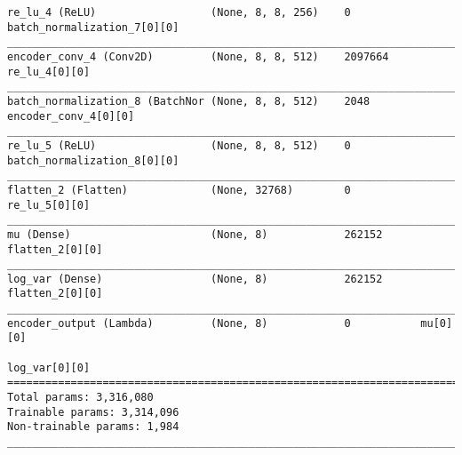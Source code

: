 \begin{lstlisting}[caption={CelebA-VAE-GAN Encoder},captionpos=b,basicstyle=\tiny, label={lst:mnist-vae-encoder}]
re_lu_4 (ReLU)                  (None, 8, 8, 256)    0           batch_normalization_7[0][0]
__________________________________________________________________________________________________
encoder_conv_4 (Conv2D)         (None, 8, 8, 512)    2097664     re_lu_4[0][0]
__________________________________________________________________________________________________
batch_normalization_8 (BatchNor (None, 8, 8, 512)    2048        encoder_conv_4[0][0]
__________________________________________________________________________________________________
re_lu_5 (ReLU)                  (None, 8, 8, 512)    0           batch_normalization_8[0][0]
__________________________________________________________________________________________________
flatten_2 (Flatten)             (None, 32768)        0           re_lu_5[0][0]
__________________________________________________________________________________________________
mu (Dense)                      (None, 8)            262152      flatten_2[0][0]
__________________________________________________________________________________________________
log_var (Dense)                 (None, 8)            262152      flatten_2[0][0]
__________________________________________________________________________________________________
encoder_output (Lambda)         (None, 8)            0           mu[0][0]
                                                                 log_var[0][0]
==================================================================================================
Total params: 3,316,080
Trainable params: 3,314,096
Non-trainable params: 1,984
__________________________________________________________________________________________________
\end{lstlisting}
